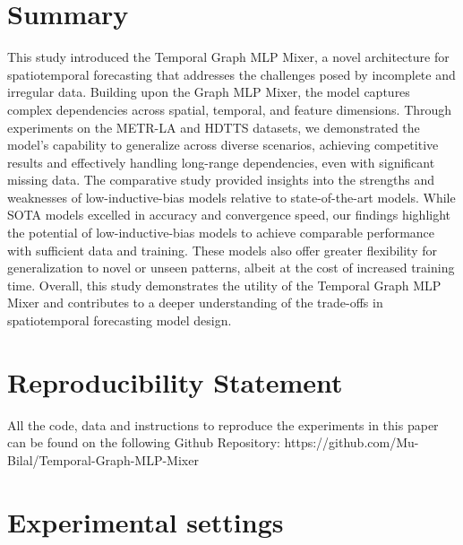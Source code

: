 \documentclass{article}
\theoremstyle{plain}
\theoremstyle{definition}
\theoremstyle{remark}
\begin{document}
\section{Summary}

This study introduced the Temporal Graph MLP Mixer, a novel architecture for spatiotemporal forecasting that addresses the challenges posed by incomplete and irregular data. Building upon the Graph MLP Mixer, the model captures complex dependencies across spatial, temporal, and feature dimensions. Through experiments on the METR-LA and HDTTS datasets, we demonstrated the model’s capability to generalize across diverse scenarios, achieving competitive results and effectively handling long-range dependencies, even with significant missing data. The comparative study provided insights into the strengths and weaknesses of low-inductive-bias models relative to state-of-the-art models. While SOTA models excelled in accuracy and convergence speed, our findings highlight the potential of low-inductive-bias models to achieve comparable performance with sufficient data and training. These models also offer greater flexibility for generalization to novel or unseen patterns, albeit at the cost of increased training time. Overall, this study demonstrates the utility of the Temporal Graph MLP Mixer and contributes to a deeper understanding of the trade-offs in spatiotemporal forecasting model design.

\section{Reproducibility Statement}
All the code, data and instructions to reproduce the experiments in this paper can be found on the following Github Repository: https://github.com/Mu-Bilal/Temporal-Graph-MLP-Mixer

\nocite{}





\newpage
\appendix
\onecolumn
\section{Experimental settings}
\end{document}
